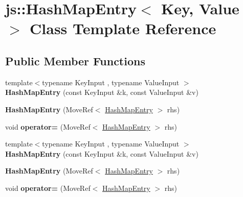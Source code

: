\hypertarget{classjs_1_1_hash_map_entry}{\section{js\-:\-:Hash\-Map\-Entry$<$ Key, Value $>$ Class Template Reference}
\label{classjs_1_1_hash_map_entry}
}
\subsection*{Public Member Functions}
\begin{DoxyCompactItemize}
\item 
\hypertarget{classjs_1_1_hash_map_entry_a8015c99e67faea6cbd85a3b0e121cc86}{{\footnotesize template$<$typename Key\-Input , typename Value\-Input $>$ }\\{\bfseries Hash\-Map\-Entry} (const Key\-Input \&k, const Value\-Input \&v)}\label{classjs_1_1_hash_map_entry_a8015c99e67faea6cbd85a3b0e121cc86}

\item 
\hypertarget{classjs_1_1_hash_map_entry_afa422da01490c693daf2714a2da11dca}{{\bfseries Hash\-Map\-Entry} (Move\-Ref$<$ \hyperlink{classjs_1_1_hash_map_entry}{Hash\-Map\-Entry} $>$ rhs)}\label{classjs_1_1_hash_map_entry_afa422da01490c693daf2714a2da11dca}

\item 
\hypertarget{classjs_1_1_hash_map_entry_a253b1fe42e0383a9894c90f1a201f272}{void {\bfseries operator=} (Move\-Ref$<$ \hyperlink{classjs_1_1_hash_map_entry}{Hash\-Map\-Entry} $>$ rhs)}\label{classjs_1_1_hash_map_entry_a253b1fe42e0383a9894c90f1a201f272}

\item 
\hypertarget{classjs_1_1_hash_map_entry_a8015c99e67faea6cbd85a3b0e121cc86}{{\footnotesize template$<$typename Key\-Input , typename Value\-Input $>$ }\\{\bfseries Hash\-Map\-Entry} (const Key\-Input \&k, const Value\-Input \&v)}\label{classjs_1_1_hash_map_entry_a8015c99e67faea6cbd85a3b0e121cc86}

\item 
\hypertarget{classjs_1_1_hash_map_entry_afa422da01490c693daf2714a2da11dca}{{\bfseries Hash\-Map\-Entry} (Move\-Ref$<$ \hyperlink{classjs_1_1_hash_map_entry}{Hash\-Map\-Entry} $>$ rhs)}\label{classjs_1_1_hash_map_entry_afa422da01490c693daf2714a2da11dca}

\item 
\hypertarget{classjs_1_1_hash_map_entry_a253b1fe42e0383a9894c90f1a201f272}{void {\bfseries operator=} (Move\-Ref$<$ \hyperlink{classjs_1_1_hash_map_entry}{Hash\-Map\-Entry} $>$ rhs)}\label{classjs_1_1_hash_map_entry_a253b1fe42e0383a9894c90f1a201f272}

\end{DoxyCompactItemize}
